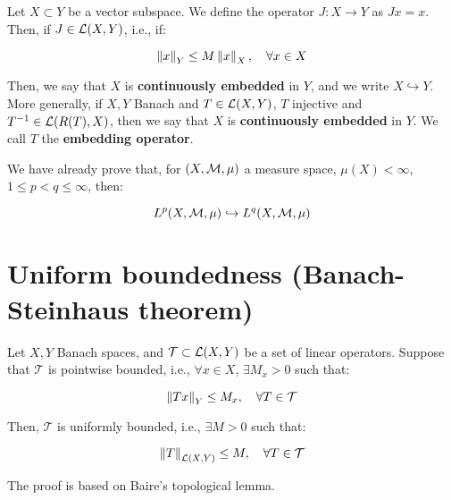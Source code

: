 \begin{fdefinition}
    Let $X \subset Y$ be a vector subspace. We define the 
    operator $J: X \to Y$ as $Jx = x$. Then, if $J \in \mathcal{L}(X, Y)$, i.e., 
    if:

    $$\left\|x\right\|_Y \leq M \left\|x\right\|_X, \quad \forall x \in X$$

    Then, we say that $X$ is \textbf{continuously embedded} in $Y$, 
    and we write $X \hookrightarrow Y$.\\

    More generally, if $X, Y$ Banach and $T \in \mathcal{L}(X, Y)$, $T$ injective
    and $T^{-1} \in \mathcal{L}(R(T), X)$, then we say that $X$ is \textbf{continuously embedded}
    in $Y$. We call $T$ the \textbf{embedding operator}.
    
\end{fdefinition}

\begin{fexample}
    We have already prove that, for $(X, \mathcal{M}, \mu)$ a measure space,
    $\mu(X) < \infty$, $1 \leq p < q \leq \infty$, then:

    $$L^p(X, \mathcal{M}, \mu) \hookrightarrow L^q(X, \mathcal{M}, \mu)$$
\end{fexample}

\section{Uniform boundedness (Banach-Steinhaus theorem)}

\begin{ftheorem}
    Let $X, Y$ Banach spaces, and $\mathcal{T} \subset \mathcal{L}(X, Y)$ be 
    a set of linear operators. Suppose that $\mathcal{T}$ is
    pointwise bounded, i.e., $\forall x \in X$, $\exists M_x > 0$ such that:

    $$\left\|Tx\right\|_Y \leq M_x, \quad \forall T \in \mathcal{T}$$

    Then, $\mathcal{T}$ is uniformly bounded, i.e., $\exists M > 0$ such that:

    $$\left\|T\right\|_{\mathcal{L}(X, Y)} \leq M, \quad \forall T \in \mathcal{T}$$
\end{ftheorem}

\begin{note}
    The proof is based on Baire's topological lemma.
\end{note}

\vspace{1em}

